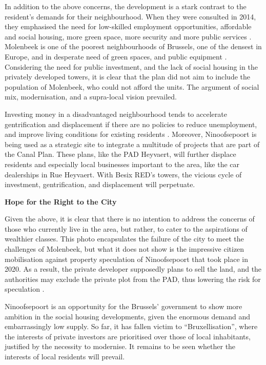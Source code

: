 \documentclass{article}[11pt]
\begin{document}
In addition to the above concerns, the development is a stark contrast to the resident's demands for their neighbourhood. When they were consulted in 2014, they emphasised the need for low-skilled employment opportunities, affordable and social housing, more green space, more security and more public services \parencite{diagnosticNinove}. 
Molenbeek is one of the poorest neighbourhoods of Brussels, one of the densest in Europe, and in desperate need of green spaces, and public equipment \parencite{ieb2019ninove}. Considering the need for public investment, and the lack of social housing in the privately developed towers, it is clear that the plan did not aim to include the population of Molenbeek, who could not afford the units. 
The argument of social mix, modernisation, and a supra-local vision prevailed.

Investing money in a disadvantaged neighbourhood tends to accelerate gentrification and displacement if there are no policies to reduce unemployment, and improve living conditions for existing residents \parencite{required}.
Moreover, Ninoofsepoort is being used as a strategic site to integrate a multitude of projects that are part of the Canal Plan. These plans, like the PAD Heyvaert, will further displace residents and especially local businesses important to the area, like the car dealerships in Rue Heyvaert.
With Besix RED's towers, the vicious cycle of investment, gentrification, and displacement will perpetuate.


\textbf{Hope for the Right to the City}

Given the above, it is clear that there is no intention to address the concerns of those who currently live in the area, but rather, to cater to the aspirations of wealthier classes. 
This photo encapsulates the failure of the city to meet the challenges of Molenbeek, but what it does not show is the impressive citizen mobilisation against property speculation of Ninoofsepoort that took place in 2020. As a result, the private developer supposedly plans to sell the land, and the authorities may exclude the private plot from the PAD, thus lowering the risk for speculation \parencite{ieb2020ninove}.

Ninoofsepoort is an opportunity for the Brussels' government to show more ambition in the social housing developments, given the enormous demand and embarrassingly low supply. So far, it has fallen victim to ``Bruxellisation'', where the interests of private investors are prioritised over those of local inhabitants, justified by the necessity to modernise. It remains to be seen whether the interests of local residents will prevail.

\pagebreak

\printbibliography 
\end{document}
